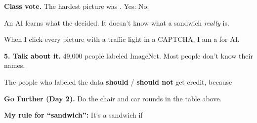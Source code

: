 \documentclass[11pt]{article}
\begin{document}
\vspace{0.8em}
\textbf{Class vote.} The hardest picture was \blank{1.2in}. \quad Yes: \blank{0.5in} \quad No: \blank{0.5in}

\vspace{0.9em}
An AI learns what the  decided. It doesn't know what a sandwich \emph{really} is.

\vspace{0.9em}
When I click every picture with a traffic light in a CAPTCHA, I am a  for AI.

\vspace{1.1em}
{\large\textbf{5. Talk about it.}} 49,000 people labeled ImageNet. Most people don't know their names.

\vspace{0.6em}
The people who labeled the data \textbf{should} / \textbf{should not} get credit, because 

\vspace{0.9em}
\blank{6.9in}

\vspace{1.0em}
{\large\textbf{Go Further (Day 2).}} Do the chair and car rounds in the table above.

\vspace{0.6em}
\textbf{My rule for ``sandwich'':} It's a sandwich if 

\vfill
\cuthere
\noindent{}\hfill
{}\hfill
{}
\end{document}
